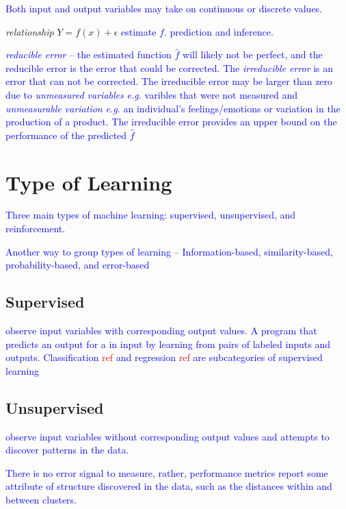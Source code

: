 \textcolor{blue}{Both input and output variables may take on continuous or discrete values.}

\emph{relationship} $Y = f(x) + \epsilon$ \textcolor{blue}{estimate $f$. prediction and inference}.

\textcolor{blue}{\emph{reducible error} -- the estimated function $\hat{f}$ will likely not be perfect, and the reducible error is the error that could be corrected.  The \emph{irreducible error} is an error that can not be corrected. The irreducible error may be larger than zero due to \emph{unmeasured variables} \emph{e.g.} varibles that were not measured and \emph{unmeasurable variation} \emph{e.g.} an individual's feelings/emotions or variation in the production of a product. The irreducible error provides an upper bound on the performance of the predicted $\hat{f}$}

\section{Type of Learning}

\textcolor{blue}{Three main types of machine learning: supervised, unsupervised, and reinforcement.}

\textcolor{blue}{Another way to group types of learning -- Information-based, similarity-based, probability-based, and error-based}

\subsection{Supervised}

\textcolor{blue}{observe input variables with corresponding output values. A program that predicts an output for a in input by learning from pairs of labeled inputs and outputs. Classification \textcolor{red}{ref} and regression \textcolor{red}{ref} are subcategories of supervised learning}

\subsection{Unsupervised}

\textcolor{blue}{observe input variables without corresponding output values and attempts to discover patterns in the data.}

\textcolor{blue}{There is no error signal to measure, rather, performance metrics report some attribute of structure discovered in the data, such as the distances within and between clusters.}
 
